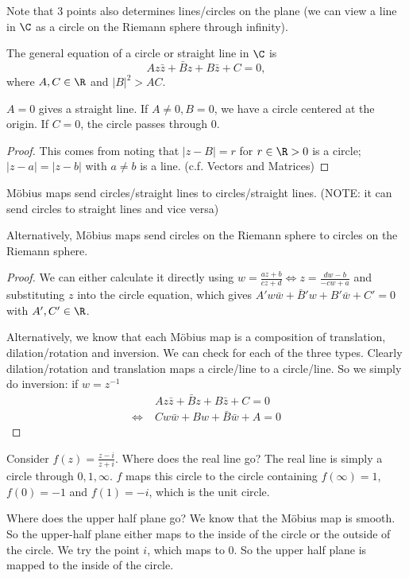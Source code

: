 \documentclass[a4pape]{article}
\begin{document}
Note that 3 points also determines lines/circles on the plane (we can view a line in $\C$ as a circle on the Riemann sphere through infinity).

\begin{lemma}
  The general equation of a circle or straight line in $\C$ is
  \[
  Az\bar z + \bar Bz + B\bar z + C = 0,
  \]
where $A, C\in \R$ and $|B|^2 > AC$.
\end{lemma}
\note $A = 0$ gives a straight line. If $A \not= 0, B = 0$, we have a circle centered at the origin. If $C = 0$, the circle passes through 0.

\begin{proof}
  This comes from noting that $|z - B| = r$ for $r \in \R> 0$ is a circle; $|z - a| = |z - b|$ with $a\not= b $ is a line. (c.f. Vectors and Matrices)
\end{proof}

\begin{prop}
  M\"obius maps send circles/straight lines to circles/straight lines. (NOTE: it can send circles to straight lines and vice versa)

  Alternatively, M\"obius maps send circles on the Riemann sphere to circles on the Riemann sphere.
\end{prop}

\begin{proof}
  We can either calculate it directly using $w = \frac{az + b}{cz + d}\Leftrightarrow z = \frac{dw - b}{-cw + a}$ and substituting $z$ into the circle equation, which gives $A' w\bar w + \bar B' w + B'\bar w + C' = 0$ with $A', C'\in \R$.

  Alternatively, we know that each M\"obius map is a composition of translation, dilation/rotation and inversion. We can check for each of the three types. Clearly dilation/rotation and translation maps a circle/line to a circle/line. So we simply do inversion: if $w = z^{-1}$
  \begin{align*}
    &\; Az\bar z + \bar Bz + B\bar z + C = 0\\
    \Leftrightarrow &\;  Cw\bar w + Bw + \bar B\bar w + A = 0
  \end{align*}
\end{proof}

\begin{eg}
  Consider $f(z) = \frac{z - i}{z + i}$. Where does the real line go? The real line is simply a circle through $0, 1, \infty$. $f$ maps this circle to the circle containing $f(\infty) = 1$, $f(0) = -1$ and $f(1) = -i$, which is the unit circle.

Where does the upper half plane go? We know that the M\"obius map is smooth. So the upper-half plane either maps to the inside of the circle or the outside of the circle. We try the point $i$, which maps to $0$. So the upper half plane is mapped to the inside of the circle.
\end{eg}
\end{document}

